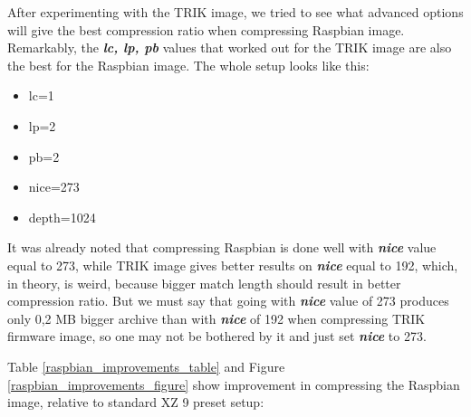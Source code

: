 \documentclass[conference]{IEEEtran}
\begin{document}
After experimenting with the TRIK image, we tried to see what advanced options will give the best compression ratio when compressing Raspbian image. Remarkably, the \textbf{\textit{lc, lp, pb}} values that worked out for the TRIK image are also the best for the Raspbian image. The whole setup looks like this:
\begin{itemize}
\item lc=1
\item lp=2
\item pb=2
\item nice=273
\item depth=1024
\end{itemize}

It was already noted that compressing Raspbian is done well with \textbf{\textit{nice}} value equal to 273, while TRIK image gives better results on \textbf{\textit{nice}} equal to 192, which, in theory, is weird, because bigger match length should result in better compression ratio. But we must say that going with \textbf{\textit{nice}} value of 273 produces only 0,2 MB bigger archive than with \textbf{\textit{nice}} of 192 when compressing TRIK firmware image, so one may not be bothered by it and just set \textbf{\textit{nice}} to 273. 

Table \ref{raspbian_improvements_table} and Figure \ref{raspbian_improvements_figure} show improvement in compressing the Raspbian image, relative to standard XZ 9 preset setup:
% 
\end{document}
